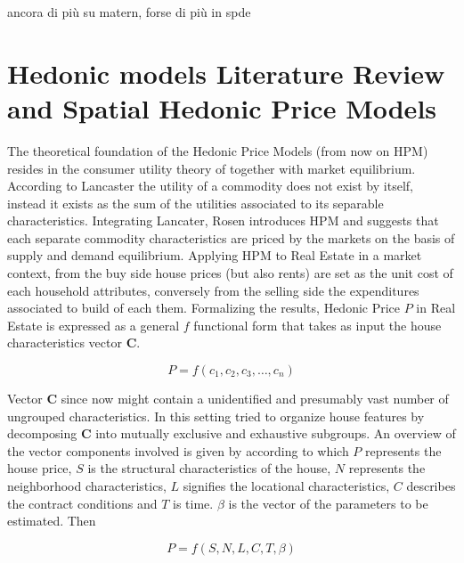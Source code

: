 \documentclass[
  12pt,
  a4paper,
  oneside]{book}
\theoremstyle{definition}
\theoremstyle{definition}
\theoremstyle{definition}
\theoremstyle{remark}
\begin{document}
ancora di più su matern, forse di più in spde

\hypertarget{hedonic-models-literature-review-and-spatial-hedonic-price-models}{%
\section{Hedonic models Literature Review and Spatial Hedonic Price Models}\label{hedonic-models-literature-review-and-spatial-hedonic-price-models}}

The theoretical foundation of the Hedonic Price Models (from now on HPM) resides in the consumer utility theory of \citet{Lancaster} together with \citet{Rosen} market equilibrium. According to Lancaster the utility of a commodity does not exist by itself, instead it exists as the sum of the utilities associated to its separable characteristics. Integrating Lancater, Rosen introduces HPM and suggests that each separate commodity characteristics are priced by the markets on the basis of supply and demand equilibrium. Applying HPM to Real Estate in a market context, from the buy side house prices (but also rents) are set as the unit cost of each household attributes, conversely from the selling side the expenditures associated to build of each them.
Formalizing the results, Hedonic Price \(P\) in Real Estate is expressed as a general \(f\) functional form that takes as input the house characteristics vector \(\mathbf{C}\).

\[P=f\left(c_{1}, c_{2}, c_{3}, \ldots, c_{n}\right)\]

Vector \(\mathbf{C}\) since now might contain a unidentified and presumably vast number of ungrouped characteristics. In this setting \citet{Malpezzi} tried to organize house features by decomposing \(\mathbf{C}\) into mutually exclusive and exhaustive subgroups. An overview of the vector components involved is given by \citet{Ling} according to which \(P\) represents the house price, \(S\) is the structural characteristics of the house, \(N\) represents the neighborhood characteristics, \(L\) signifies the locational characteristics, \(C\) describes the contract conditions and \(T\) is time. \(\beta\) is the vector of the parameters to be estimated. Then

\[P=f\left(S, N, L, C, T, \beta\right)\]
\end{document}
